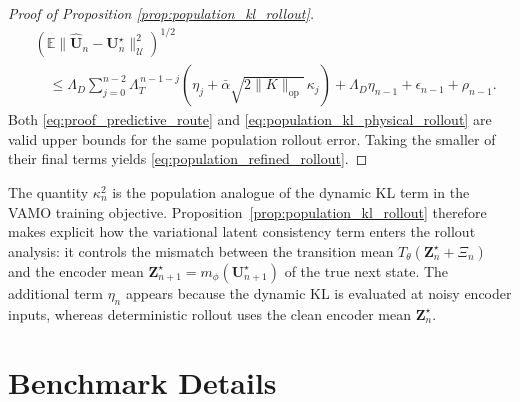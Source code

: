 \documentclass[11pt]{article}
\begin{document}
\begin{proof}[Proof of Proposition \ref{prop:population_kl_rollout}]
\begin{align}
    &
    \left(
        \mathbb E
        \|\widehat{\mathbf U}_n-\mathbf U_n^\star\|_{\mathcal U}^2
    \right)^{1/2}
    \nonumber\\
    &\quad\leq
    \Lambda_D
    \sum_{j=0}^{n-2}
    \Lambda_T^{\,n-1-j}
    \left(\eta_j+\bar\alpha\sqrt{2\|K\|_{\mathrm{op}}}\,\kappa_j\right)
    +
    \Lambda_D\eta_{n-1}
    +
    \epsilon_{n-1}
    +
    \rho_{n-1}.
    \label{eq:proof_predictive_route}
\end{align}
Both \eqref{eq:proof_predictive_route} and \eqref{eq:population_kl_physical_rollout} are valid upper bounds for the same population rollout error. Taking the smaller of their final terms yields \eqref{eq:population_refined_rollout}.
\end{proof}

The quantity $\kappa_n^2$ is the population analogue of the dynamic KL term in the VAMO training objective. Proposition~\ref{prop:population_kl_rollout} therefore makes explicit how the variational latent consistency term enters the rollout analysis: it controls the mismatch between the transition mean $T_\theta(\mathbf Z_n^\star+\Xi_n)$ and the encoder mean $\mathbf Z_{n+1}^\star=m_\phi(\mathbf U_{n+1}^\star)$ of the true next state. The additional term
$\eta_n$ appears because the dynamic KL is evaluated at noisy encoder inputs, whereas deterministic rollout uses the clean encoder mean $\mathbf Z_n^\star$.


\section{Benchmark Details}\label{app:benchmark_details}
\end{document}
